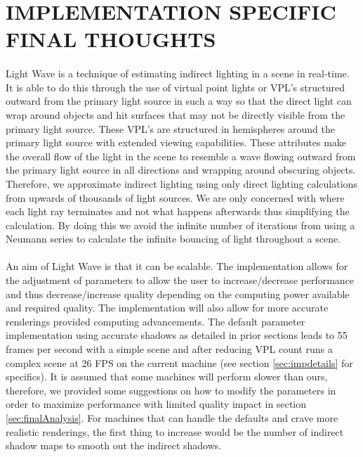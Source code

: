 \section{IMPLEMENTATION SPECIFIC FINAL THOUGHTS}
\paragraph{}
Light Wave is a technique of estimating indirect lighting in a scene in real-time.  It is able to do this through the use of virtual point lights or VPL's structured outward from the primary light source in such a way so that the direct light can wrap around objects and hit surfaces that may not be directly visible from the primary light source.  These VPL's are structured in hemispheres around the primary light source with extended viewing capabilities.  These attributes make the overall flow of the light in the scene to resemble a wave flowing outward from the primary light source in all directions and wrapping around obscuring objects.  Therefore, we approximate indirect lighting using only direct lighting calculations from upwards of thousands of light sources.  We are only concerned with where each light ray terminates and not what happens afterwards thus simplifying the calculation.  By doing this we avoid the infinite number of iterations from using a Neumann series to calculate the infinite bouncing of light throughout a scene.

\paragraph{}
An aim of Light Wave is that it can be scalable.  The implementation allows for the adjustment of parameters to allow the user to increase/decrease performance and thus decrease/increase quality depending on the computing power available and required quality.  The implementation will also allow for more accurate renderings provided computing advancements.  The default parameter implementation using accurate shadows as detailed in prior sections leads to 55 frames per second with a simple scene and after reducing VPL count runs a complex scene at 26 FPS on the current machine (see section \ref{sec:impdetails} for specifics).  It is assumed that some machines will perform slower than ours, therefore, we provided some suggestions on how to modify the parameters in order to maximize performance with limited quality impact in section \ref{sec:finalAnalysis}.  For machines that can handle the defaults and crave more realistic renderings, the first thing to increase would be the number of indirect shadow maps to smooth out the indirect shadows.

